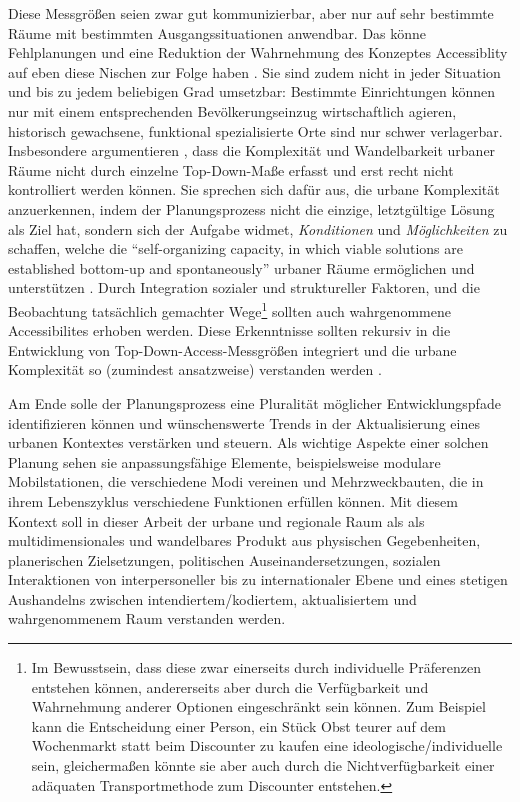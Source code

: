 \documentclass[11pt,pdftex,a4paper]{scrartcl}
\begin{document}
	Diese Messgrößen seien zwar gut kommunizierbar, aber nur auf sehr bestimmte Räume mit bestimmten Ausgangssituationen anwendbar. Das könne Fehlplanungen und eine Reduktion der Wahrnehmung des Konzeptes Accessiblity auf eben diese Nischen zur Folge haben \parencite[vgl. auch][siehe S. \pageref{fn:newurbanism}]{levineCenturyEvolutionAccessibility2020}. Sie sind zudem nicht in jeder Situation und bis zu jedem beliebigen Grad umsetzbar: Bestimmte Einrichtungen können nur mit einem entsprechenden Bevölkerungseinzug wirtschaftlich agieren, historisch gewachsene, funktional spezialisierte Orte sind nur schwer verlagerbar. Insbesondere argumentieren \citeauthor{potPrinciplesPlacebasedAccessibility2026}, dass die Komplexität und Wandelbarkeit urbaner Räume nicht durch einzelne Top-Down-Maße erfasst und erst recht nicht kontrolliert werden können. Sie sprechen sich dafür aus, die urbane Komplexität anzuerkennen, indem der Planungsprozess nicht die einzige, letztgültige Lösung als Ziel hat, sondern sich der Aufgabe widmet, \textit{Konditionen} und \textit{Möglichkeiten} zu schaffen, welche die \enquote{self-organizing capacity, in which viable solutions are established bottom-up and spontaneously} urbaner Räume ermöglichen und unterstützen \parencite[4]{potPrinciplesPlacebasedAccessibility2026}. Durch Integration sozialer und struktureller Faktoren, und die Beobachtung tatsächlich gemachter Wege\footnote{Im Bewusstsein, dass diese zwar einerseits durch individuelle Präferenzen entstehen können, andererseits aber durch die Verfügbarkeit und Wahrnehmung anderer Optionen eingeschränkt sein können. Zum Beispiel kann die Entscheidung einer Person, ein Stück Obst teurer auf dem Wochenmarkt statt beim Discounter zu kaufen eine ideologische/individuelle sein, gleichermaßen könnte sie aber auch durch die Nichtverfügbarkeit einer adäquaten Transportmethode zum Discounter entstehen.} sollten auch wahrgenommene Accessibilites erhoben werden. Diese Erkenntnisse sollten rekursiv in die Entwicklung von Top-Down-Access-Messgrößen integriert und die urbane Komplexität so (zumindest ansatzweise) verstanden werden \parencite[4f]{potPrinciplesPlacebasedAccessibility2026}.
	
	Am Ende solle der Planungsprozess eine Pluralität möglicher Entwicklungspfade identifizieren können und wünschenswerte Trends in der Aktualisierung eines urbanen Kontextes verstärken und steuern. Als wichtige Aspekte einer solchen Planung sehen sie anpassungsfähige Elemente, beispielsweise modulare Mobilstationen, die verschiedene Modi vereinen und Mehrzweckbauten, die in ihrem Lebenszyklus verschiedene Funktionen erfüllen können. Mit diesem Kontext soll in dieser Arbeit der urbane und regionale Raum als als multidimensionales und wandelbares Produkt aus physischen Gegebenheiten, planerischen Zielsetzungen, politischen Auseinandersetzungen, sozialen Interaktionen von interpersoneller bis zu internationaler Ebene und eines stetigen Aushandelns zwischen intendiertem/kodiertem, aktualisiertem und wahrgenommenem Raum \parencites[33]{lefebvreProduktionRaums2006}[59]{alexanderCityNotTree1965a} verstanden werden.
	
\end{document}
